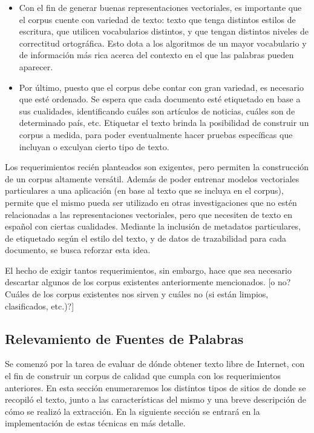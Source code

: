 \begin{itemize}
\item Con el fin de generar buenas representaciones vectoriales, es importante que el corpus cuente
con variedad de texto: texto que tenga distintos estilos de escritura, que utilicen vocabularios
distintos, y que tengan distintos niveles de correctitud ortográfica. Esto dota a los algoritmos de
un mayor vocabulario y de información más rica acerca del contexto en el que las palabras pueden
aparecer.

\item Por último, puesto que el corpus debe contar con gran variedad, es necesario que esté
ordenado. Se espera que cada documento esté etiquetado en base a sus cualidades, identificando
cuáles son artículos de noticias, cuáles son de determinado país, etc. Etiquetar el texto brinda la
posibilidad de construir un corpus a medida, para poder eventualmente hacer pruebas específicas que
incluyan o exculyan cierto tipo de texto.

\end{itemize}

Los requerimientos recién planteados son exigentes, pero permiten la construcción de un corpus
altamente versátil. Además de poder entrenar modelos vectoriales particulares a una aplicación (en
base al texto que se incluya en el corpus), permite que el mismo pueda ser utilizado en otras
investigaciones que no estén relacionadas a las representaciones vectoriales, pero que necesiten de
texto en español con ciertas cualidades. Mediante la inclusión de metadatos particulares, de
etiquetado según el estilo del texto, y de datos de trazabilidad para cada documento, se busca
reforzar esta idea.

El hecho de exigir tantos requerimientos, sin embargo, hace que sea necesario descartar algunos de
los corpus existentes anteriormente mencionados. [o no? Cuáles de los corpus existentes nos sirven y
cuáles no (si están limpios, clasificados, etc.)?]


\subsection{Relevamiento de Fuentes de Palabras}

Se comenzó por la tarea de evaluar de dónde obtener texto libre de Internet, con el fin de construir
un corpus de calidad que cumpla con los requerimientos anteriores. En esta sección enumeraremos los
distintos tipos de sitios de donde se recopiló el texto, junto a las características del mismo y una
breve descripción de cómo se realizó la extracción. En la siguiente sección se entrará en la
implementación de estas técnicas en más detalle.

